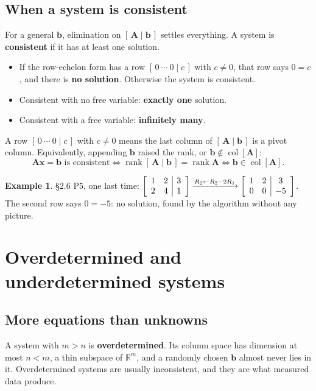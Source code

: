 \documentclass[11pt]{article}
\theoremstyle{plain}
\theoremstyle{definition}
\newtheorem{ex}{Example}[section]
\theoremstyle{remark}
\newcommand{\R}{\mathbb{R}}
\newcommand{\vc}[1]{\mathbf{#1}}
\newcommand{\mt}[1]{\mathbf{#1}}
\newcommand{\colsp}[1]{\operatorname{col}[#1]}
\DeclareMathOperator{\rank}{rank}
\newenvironment{aug}[1]{\left[\begin{array}{#1}}{\end{array}\right]}
\begin{document}
\subsection{When a system is consistent}
For a general $\vc{b}$, elimination on $[\,\mt{A}\mid\vc{b}\,]$ settles everything.
A system is \textbf{consistent} if it has at least one solution.
\begin{itemize}[leftmargin=1.4em,itemsep=3pt]
  \item If the row-echelon form has a row $[\,0\ \cdots\ 0\mid c\,]$ with
        $c\neq0$, that row says $0=c$, and there is \textbf{no solution}.
        Otherwise the system is consistent.
  \item Consistent with no free variable: \textbf{exactly one} solution.
  \item Consistent with a free variable: \textbf{infinitely many}.
\end{itemize}
A row $[\,0\ \cdots\ 0\mid c\,]$ with $c\neq0$ means the last column of
$[\,\mt{A}\mid\vc{b}\,]$ is a pivot column. Equivalently, appending $\vc{b}$
raised the rank, or $\vc{b}\notin\colsp{\mt{A}}$:
\[
  \mt{A}\vc{x}=\vc{b}\text{ is consistent}
  \iff\rank[\,\mt{A}\mid\vc{b}\,]=\rank\mt{A}
  \iff\vc{b}\in\colsp{\mt{A}} .
\]

\begin{ex}
\S2.6 P5, one last time:
$\begin{aug}{cc|c}1&2&3\\2&4&1\end{aug}\xrightarrow{R_2\gets R_2-2R_1}\begin{aug}{cc|c}1&2&3\\0&0&-5\end{aug}$.
The second row says $0=-5$: no solution, found by the algorithm without any
picture.
\end{ex}

\section{Overdetermined and underdetermined systems}

\subsection{More equations than unknowns}
A system with $m>n$ is \textbf{overdetermined}. Its column space has dimension at
most $n<m$, a thin subspace of $\R^{m}$, and a randomly chosen $\vc{b}$ almost
never lies in it. Overdetermined systems are usually inconsistent, and they are
what measured data produce.
\end{document}
